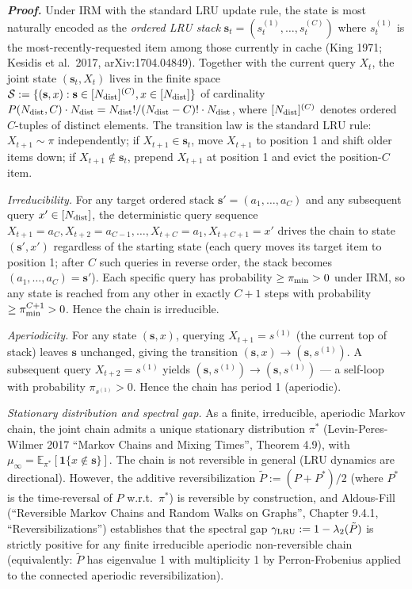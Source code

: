 \documentclass[
]{article}
\begin{document}
\emph{\textbf{Proof.}}
Under IRM with the standard LRU update rule, the state is most
naturally encoded as the \emph{ordered LRU stack}
$\mathbf{s}_t = (s_t^{(1)}, \ldots, s_t^{(C)})$ where $s_t^{(1)}$
is the most-recently-requested item among those currently in cache
(King 1971; Kesidis et al.\ 2017, arXiv:1704.04849). Together with
the current query $X_t$, the joint state $(\mathbf{s}_t, X_t)$
lives in the finite space $\mathcal{S} := \{(\mathbf{s}, x) :
\mathbf{s} \in [N_{\rm dist}]^{(C)}, x \in [N_{\rm dist}]\}$ of
cardinality $P(N_{\rm dist}, C) \cdot N_{\rm dist} = N_{\rm dist}!
/ (N_{\rm dist} - C)! \cdot N_{\rm dist}$, where $[N_{\rm dist}]^{(C)}$
denotes ordered $C$-tuples of distinct elements. The transition
law is the standard LRU rule: $X_{t+1} \sim \pi$ independently;
if $X_{t+1} \in \mathbf{s}_t$, move $X_{t+1}$ to position 1 and
shift older items down; if $X_{t+1} \notin \mathbf{s}_t$, prepend
$X_{t+1}$ at position 1 and evict the position-$C$ item.

\emph{Irreducibility.} For any target ordered stack $\mathbf{s}'
= (a_1, \ldots, a_C)$ and any subsequent query $x' \in
[N_{\rm dist}]$, the deterministic query sequence $X_{t+1} = a_C,
X_{t+2} = a_{C-1}, \ldots, X_{t+C} = a_1, X_{t+C+1} = x'$ drives
the chain to state $(\mathbf{s}', x')$ regardless of the starting
state (each query moves its target item to position 1; after
$C$ such queries in reverse order, the stack becomes
$(a_1, \ldots, a_C) = \mathbf{s}'$). Each specific query has
probability $\geq \pi_{\rm min} > 0$ under IRM, so any state is
reached from any other in exactly $C + 1$ steps with probability
$\geq \pi_{\rm min}^{C+1} > 0$. Hence the chain is irreducible.

\emph{Aperiodicity.} For any state $(\mathbf{s}, x)$, querying
$X_{t+1} = s^{(1)}$ (the current top of stack) leaves $\mathbf{s}$
unchanged, giving the transition $(\mathbf{s}, x) \to
(\mathbf{s}, s^{(1)})$. A subsequent query $X_{t+2} = s^{(1)}$
yields $(\mathbf{s}, s^{(1)}) \to (\mathbf{s}, s^{(1)})$ --- a
self-loop with probability $\pi_{s^{(1)}} > 0$. Hence the chain
has period 1 (aperiodic).

\emph{Stationary distribution and spectral gap.} As a finite,
irreducible, aperiodic Markov chain, the joint chain admits a
unique stationary distribution $\pi^*$ (Levin-Peres-Wilmer 2017
``Markov Chains and Mixing Times'', Theorem 4.9), with
$\mu_\infty = \mathbb{E}_{\pi^*}[\mathbf{1}\{x \notin \mathbf{s}\}]$.
The chain is not reversible in general (LRU dynamics are
directional). However, the additive reversibilization
$\tilde{P} := (P + P^*)/2$ (where $P^*$ is the time-reversal of
$P$ w.r.t.\ $\pi^*$) is reversible by construction, and Aldous-Fill
(``Reversible Markov Chains and Random Walks on Graphs'', Chapter
9.4.1, ``Reversibilizations'') establishes that the spectral gap
$\gamma_{\rm LRU} := 1 - \lambda_2(\tilde{P})$ is strictly positive
for any finite irreducible aperiodic non-reversible chain
(equivalently: $\tilde{P}$ has eigenvalue 1 with multiplicity 1 by
Perron-Frobenius applied to the connected aperiodic reversibilization).
\end{document}
